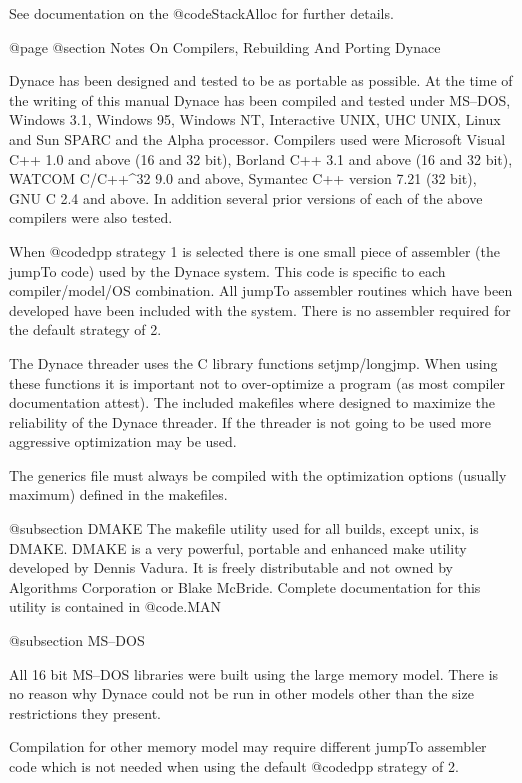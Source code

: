 See documentation on the @code{StackAlloc} for further details.


@page
@section Notes On Compilers, Rebuilding And Porting Dynace

Dynace has been designed and tested to be as portable as possible.  At
the time of the writing of this manual Dynace has been compiled and
tested under MS--DOS, Windows 3.1, Windows 95, Windows NT, Interactive
UNIX, UHC UNIX, Linux and Sun SPARC and the Alpha processor.  Compilers
used were Microsoft Visual C++ 1.0 and above (16 and 32 bit), Borland
C++ 3.1 and above (16 and 32 bit), WATCOM C/C++^32 9.0 and above,
Symantec C++ version 7.21 (32 bit), GNU C 2.4 and above.  In addition
several prior versions of each of the above compilers were also tested.

When @code{dpp} strategy 1 is selected there is one small piece of
assembler (the jumpTo code) used by the Dynace system.  This code is
specific to each compiler/model/OS combination.  All jumpTo assembler
routines which have been developed have been included with the system.
There is no assembler required for the default strategy of 2.

The Dynace threader uses the C library functions setjmp/longjmp.  When using
these functions it is important not to over-optimize a program (as most
compiler documentation attest).  The included makefiles where designed
to maximize the reliability of the Dynace threader.  If the threader is not
going to be used more aggressive optimization may be used.

The generics file must always be compiled with the optimization options
(usually maximum) defined in the makefiles.


@subsection DMAKE
The makefile utility used for all builds, except unix, is DMAKE.
DMAKE is a very powerful, portable and enhanced make utility developed
by Dennis Vadura.  It is freely distributable and not owned by
Algorithms Corporation or Blake McBride.  Complete documentation for this utility
is contained in @code{\DYNACE\DOCS\DMAKE.MAN}

@subsection MS--DOS

All 16 bit MS--DOS libraries were built using the large memory model.  There
is no reason why Dynace could not be run in other models other than the
size restrictions they present.  

Compilation for other memory model may require different jumpTo assembler
code which is not needed when using the default @code{dpp} strategy of 2.

